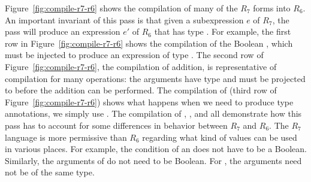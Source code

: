 \documentclass[11pt]{book}
\begin{document}
Figure~\ref{fig:compile-r7-r6} shows the compilation of many of the
$R_7$ forms into $R_6$. An important invariant of this pass is that
given a subexpression $e$ of $R_7$, the pass will produce an
expression $e'$ of $R_6$ that has type . For example, the
first row in Figure~\ref{fig:compile-r7-r6} shows the compilation of
the Boolean , which must be injected to produce an
expression of type .
%
The second row of Figure~\ref{fig:compile-r7-r6}, the compilation of
addition, is representative of compilation for many operations: the
arguments have type  and must be projected to 
before the addition can be performed.
%
The compilation of  (third row of
Figure~\ref{fig:compile-r7-r6}) shows what happens when we need to
produce type annotations, we simply use .
%
The compilation of , , and  all
demonstrate how this pass has to account for some differences in
behavior between $R_7$ and $R_6$. The $R_7$ language is more
permissive than $R_6$ regarding what kind of values can be used in
various places. For example, the condition of an  does not
have to be a Boolean. Similarly, the arguments of  do not
need to be Boolean. For , the arguments need not be of the
same type.
\end{document}

